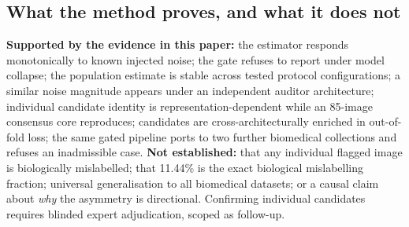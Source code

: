 \subsection{What the method proves, and what it does not}
\label{sec:proves}
\textbf{Supported by the evidence in this paper:} the estimator responds
monotonically to known injected noise; the gate refuses to report under
model collapse; the population estimate is stable across tested protocol
configurations; a similar noise magnitude appears under an independent
auditor architecture; individual candidate identity is
representation-dependent while an 85-image consensus core reproduces;
candidates are cross-architecturally enriched in out-of-fold loss; the
same gated pipeline ports to two further biomedical collections and
refuses an inadmissible case.
\textbf{Not established:} that any individual flagged image is
biologically mislabelled; that 11.44\% is the exact biological
mislabelling fraction; universal generalisation to all biomedical
datasets; or a causal claim about \emph{why} the asymmetry is
directional. Confirming individual candidates requires blinded expert
adjudication, scoped as follow-up.
